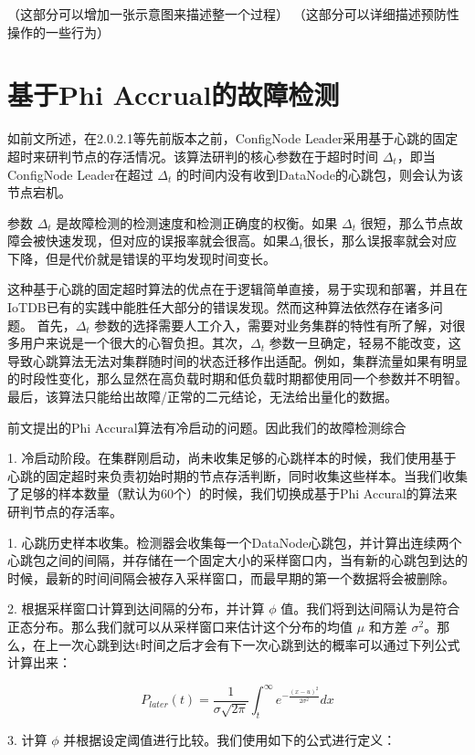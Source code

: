 （这部分可以增加一张示意图来描述整一个过程）
（这部分可以详细描述预防性操作的一些行为）



\section{基于Phi Accrual的故障检测}

如前文所述，在2.0.2.1等先前版本之前，ConfigNode Leader采用基于心跳的固定超时来研判节点的存活情况。该算法研判的核心参数在于超时时间 $\Delta_{t}$，即当ConfigNode Leader在超过 $\Delta_{t}$ 的时间内没有收到DataNode的心跳包，则会认为该节点宕机。

参数 $\Delta_{t}$ 是故障检测的检测速度和检测正确度的权衡。如果 $\Delta_{t}$ 很短，那么节点故障会被快速发现，但对应的误报率就会很高。如果$\Delta_{t}$很长，那么误报率就会对应下降，但是代价就是错误的平均发现时间变长。

这种基于心跳的固定超时算法的优点在于逻辑简单直接，易于实现和部署，并且在IoTDB已有的实践中能胜任大部分的错误发现。然而这种算法依然存在诸多问题。
首先，$\Delta_{t}$ 参数的选择需要人工介入，需要对业务集群的特性有所了解，对很多用户来说是一个很大的心智负担。其次，$\Delta_{t}$ 参数一旦确定，轻易不能改变，这导致心跳算法无法对集群随时间的状态迁移作出适配。例如，集群流量如果有明显的时段性变化，那么显然在高负载时期和低负载时期都使用同一个参数并不明智。最后，该算法只能给出故障/正常的二元结论，无法给出量化的数据。

前文提出的Phi Accural算法有冷启动的问题。因此我们的故障检测综合

1. 冷启动阶段。在集群刚启动，尚未收集足够的心跳样本的时候，我们使用基于心跳的固定超时来负责初始时期的节点存活判断，同时收集这些样本。当我们收集了足够的样本数量（默认为60个）的时候，我们切换成基于Phi Accural的算法来研判节点的存活率。

1. 心跳历史样本收集。检测器会收集每一个DataNode心跳包，并计算出连续两个心跳包之间的间隔，并存储在一个固定大小的采样窗口内，当有新的心跳包到达的时候，最新的时间间隔会被存入采样窗口，而最早期的第一个数据将会被删除。

2. 根据采样窗口计算到达间隔的分布，并计算 $\phi$ 值。我们将到达间隔认为是符合正态分布。那么我们就可以从采样窗口来估计这个分布的均值 $\mu$ 和方差 $\sigma^2$。那么，在上一次心跳到达t时间之后才会有下一次心跳到达的概率可以通过下列公式计算出来：

$$ P_{later}(t) = \frac{1}{\sigma\sqrt{2\pi}} \int_{t}^{\infty} e^{-\frac{(x-u)^2}{2\sigma^2}} dx $$

3. 计算 $\phi$ 并根据设定阈值进行比较。我们使用如下的公式进行定义：

